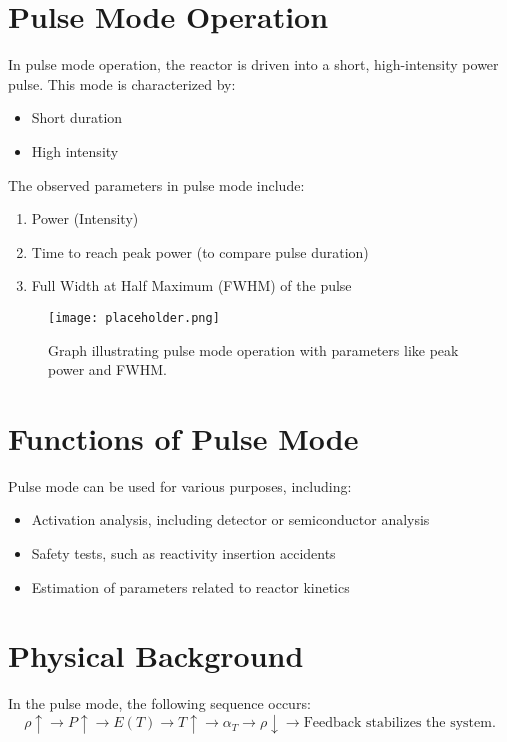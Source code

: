 \section{Pulse Mode Operation}

In pulse mode operation, the reactor is driven into a short, high-intensity power pulse. This mode is characterized by:
\begin{itemize}
    \item Short duration
    \item High intensity
\end{itemize}

The observed parameters in pulse mode include:
\begin{enumerate}
    \item Power (Intensity)
    \item Time to reach peak power (to compare pulse duration)
    \item Full Width at Half Maximum (FWHM) of the pulse
\end{enumerate}

\begin{figure}[h]
    \centering
        \texttt{[image: placeholder.png]}
    \caption{Graph illustrating pulse mode operation with parameters like peak power and FWHM.}
\end{figure}

\section{Functions of Pulse Mode}

Pulse mode can be used for various purposes, including:
\begin{itemize}
    \item Activation analysis, including detector or semiconductor analysis
    \item Safety tests, such as reactivity insertion accidents
    \item Estimation of parameters related to reactor kinetics
\end{itemize}

\section{Physical Background}

In the pulse mode, the following sequence occurs:
\[
\rho \uparrow \rightarrow P \uparrow \rightarrow E(T) \rightarrow T \uparrow \rightarrow \alpha_T \rightarrow \rho \downarrow \rightarrow \text{Feedback stabilizes the system.}
\]

